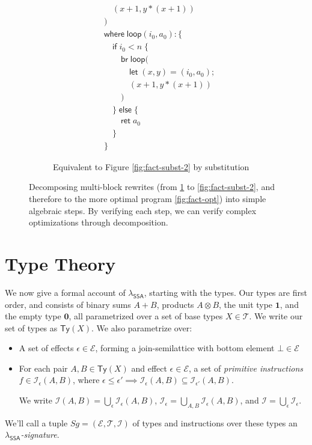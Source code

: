 \documentclass[acmsmall,screen,review]{acmart}
\newcommand{\mc}[1]{\ensuremath{\mathcal{#1}}}
\newcommand{\mb}[1]{\ensuremath{\mathbf{#1}}}
\newcommand{\ms}[1]{\ensuremath{\mathsf{#1}}}
\newcommand{\isotopessa}{\(\lambda_{\ms{SSA}}\)}
\begin{document}
\begin{figure}
\begin{subfigure}[c]{.5\textwidth}
\begin{align*}
      & \quad(x + 1, y * (x + 1)) \\
      & ) \\
      & \ms{where}\;\ms{loop}(i_0, a_0): \{\\
      & \quad \ms{if}\;i_0 < n\;\{ \\
      & \qquad \ms{br}\;\ms{loop}( \\
      & \qquad \quad \ms{let}\;(x, y) = (i_0, a_0); \\
      & \qquad \quad (x + 1, y * (x + 1)) \\ 
      & \qquad ) \\
      & \quad \}\;\ms{else}\;\{ \\
      & \qquad \ms{ret}\;a_0 \\
      & \quad \} \\
      & \}
    \end{align*}
    \caption{Equivalent to Figure \ref{fig:fact-subst-2} by substitution}
    \label{fig:fact-zero}
  \end{subfigure}
  \caption{
    Decomposing multi-block rewrites (from \ref{fig:fact-zero} to
    \ref{fig:fact-subst-2}, and therefore to the more optimal program 
    \ref{fig:fact-opt}) into simple algebraic steps. By verifying each step, we can
    verify complex optimizations through decomposition.
  } 
  \Description{}
  \label{fig:fact-dinat-rewrites}
\end{figure}

\section{Type Theory}

\label{sec:typing}

We now give a formal account of \isotopessa{}, starting with the types. Our types are first order,
and consists of binary sums $A + B$, products $A \otimes B$, the unit type $\mathbf{1}$, and the
empty type $\mb{0}$, all parametrized over a set of base types $X \in \mc{T}$. We write our set of
types as $\ms{Ty}(X)$. We also parametrize over:
\begin{itemize}
  
  \item A set of effects $\epsilon \in \mc{E}$, forming a join-semilattice with bottom element $\bot
  \in \mc{E}$
  
  \item For each pair $A, B \in \ms{Ty}(X)$ and effect $\epsilon \in \mc{E}$, a
  set of \textit{primitive instructions} $f \in \mc{I}_\epsilon(A, B)$, where
  $\epsilon \leq \epsilon' \implies \mc{I}_\epsilon(A, B) \subseteq
  \mc{I}_{\epsilon'}(A, B)$. 
  
  We write $\mc{I}(A, B) = \bigcup_\epsilon\mc{I}_\epsilon(A, B)$,
  $\mc{I}_\epsilon = \bigcup_{A, B}\mc{I}_\epsilon(A, B)$, and $\mc{I} =
  \bigcup_\epsilon\mc{I}_\epsilon$.

\end{itemize}
We'll call a tuple $Sg = (\mc{E}, \mc{T}, \mc{I})$ of types and instructions over these types an
\emph{\isotopessa{}-signature}.
\end{document}
